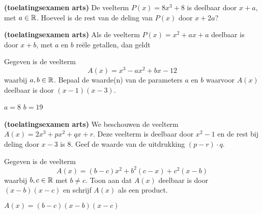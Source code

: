 \documentclass{ximera}
\begin{document}

\begin{exercise}
{\bf (toelatingsexamen arts)}
De veelterm \(P(x) = 8x^3 + 8\) is deelbaar door \(x+a\), met \(a \in \mathbb{R}\). Hoeveel is de rest van de deling van \(P(x)\) door \(x+2a\)?
\begin{multipleChoice}
\end{multipleChoice}
\end{exercise}

\begin{exercise}
{\bf (toelatingsexamen arts)}
Als de veelterm \(P(x) = x^2 + ax + a\) deelbaar is door \(x+b\), met \(a\) en \(b\) reële getallen, dan geldt
\begin{multipleChoice}
\end{multipleChoice}
\end{exercise}

\begin{exercise}
Gegeven is de veelterm
\[
A(x) = x^3 - ax^2 + bx - 12
\]
waarbij \(a,b \in \mathbb{R}\). Bepaal de waarde(n) van de parameters \(a\) en \(b\) waarvoor \(A(x)\) deelbaar is door \((x-1)(x-3)\). 

\begin{uitkomst} \(a = 8\)  \(b = 19\) \end{uitkomst}
\end{exercise}

\begin{exercise}
{\bf (toelatingsexamen arts)}
We beschouwen de veelterm \(A(x) = 2x^3 + px^2 + qx + r\). Deze veelterm is deelbaar door \(x^2 - 1\) en de rest bij deling door \(x-3\) is \(8\). Geef de waarde van de uitdrukking \((p-r)\cdot q\).
\begin{multipleChoice}
\end{multipleChoice}
\end{exercise}

\begin{exercise}
Gegeven is de veelterm
\[
A(x) = (b-c)x^2 + b^2(c-x) + c^2(x-b)
\]
waarbij \(b,c \in \mathbb{R}\) met \(b \neq c\). Toon aan dat \(A(x)\) deelbaar is door \((x-b)(x-c)\) en schrijf \(A(x)\) als een product. 
\begin{uitkomst} \( A(x) = (b-c)(x-b)(x-c) \) \end{uitkomst}
\end{exercise}
\end{document}
